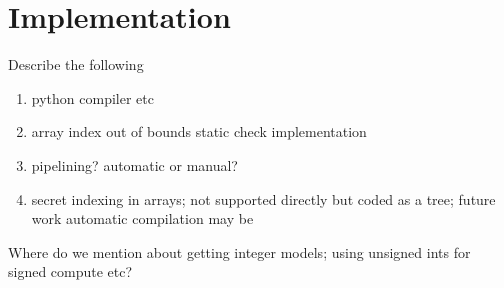 \section{Implementation}
\label{sec:impl}
Describe the following
\begin{enumerate}
\item python compiler etc
\item array index out of bounds static check implementation
\item pipelining? automatic or manual?
\item secret indexing in arrays; not supported directly but coded as a tree; future work automatic compilation may be


\end{enumerate}

Where do we mention about getting integer models; using unsigned ints for signed compute etc?